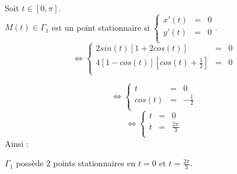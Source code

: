 Soit $t\in\left[0,\pi\right]$.\\
$M(t)\in\Gamma_1$ est un point stationnaire si
$
  \left\{
  \begin{array}{rcl}
    x'(t) & = & 0 \\
    y'(t) & = & 0 \\
  \end{array}
  \right.
$.
\[
  \iff
  \left\{
  \begin{array}{rcl}
    2sin(t)\left[1+2cos(t)\right]                         & = & 0 \\
    4\left[1-cos(t)\right]\left[cos(t)+\frac{1}{2}\right] & = & 0 \\
  \end{array}
  \right.
\]

\[
  \iff
  \left\{
  \begin{array}{rcc}
    t & = & 0              \\
    cos(t) & = & -\frac{1}{2} \\
  \end{array}
  \right.
\]
\[
  \iff
  \left\{
  \begin{array}{rcc}
    t & = & 0              \\
    t & = & \frac{2\pi}{3} \\
  \end{array}
  \right.
\]
Ainsi :
\begin{result}
  $\Gamma_1$ possède 2 points stationnaires en $t=0$ et $t=\frac{2\pi}{3}$.
\end{result}
